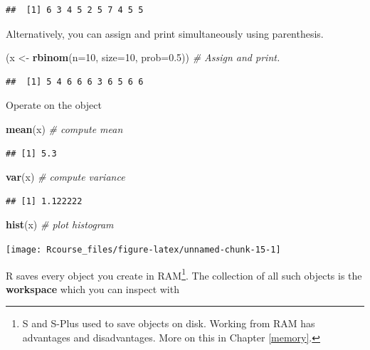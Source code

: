 \documentclass[]{book}
\newenvironment{Shaded}{\begin{snugshade}}{\end{snugshade}}
\newcommand{\KeywordTok}[1]{\textcolor[rgb]{0.13,0.29,0.53}{\textbf{#1}}}
\newcommand{\DataTypeTok}[1]{\textcolor[rgb]{0.13,0.29,0.53}{#1}}
\newcommand{\DecValTok}[1]{\textcolor[rgb]{0.00,0.00,0.81}{#1}}
\newcommand{\FloatTok}[1]{\textcolor[rgb]{0.00,0.00,0.81}{#1}}
\newcommand{\StringTok}[1]{\textcolor[rgb]{0.31,0.60,0.02}{#1}}
\newcommand{\CommentTok}[1]{\textcolor[rgb]{0.56,0.35,0.01}{\textit{#1}}}
\newcommand{\NormalTok}[1]{#1}
\theoremstyle{definition}
\theoremstyle{definition}
\theoremstyle{definition}
\theoremstyle{remark}
\begin{document}
\begin{verbatim}
##  [1] 6 3 4 5 2 5 7 4 5 5
\end{verbatim}

Alternatively, you can assign and print simultaneously using
parenthesis.

\begin{Shaded}
\begin{Highlighting}[]
\NormalTok{(x <-}\StringTok{ }\KeywordTok{rbinom}\NormalTok{(}\DataTypeTok{n=}\DecValTok{10}\NormalTok{, }\DataTypeTok{size=}\DecValTok{10}\NormalTok{, }\DataTypeTok{prob=}\FloatTok{0.5}\NormalTok{))  }\CommentTok{# Assign and print.}
\end{Highlighting}
\end{Shaded}

\begin{verbatim}
##  [1] 5 4 6 6 6 3 6 5 6 6
\end{verbatim}

Operate on the object

\begin{Shaded}
\begin{Highlighting}[]
\KeywordTok{mean}\NormalTok{(x)  }\CommentTok{# compute mean}
\end{Highlighting}
\end{Shaded}

\begin{verbatim}
## [1] 5.3
\end{verbatim}

\begin{Shaded}
\begin{Highlighting}[]
\KeywordTok{var}\NormalTok{(x)  }\CommentTok{# compute variance}
\end{Highlighting}
\end{Shaded}

\begin{verbatim}
## [1] 1.122222
\end{verbatim}

\begin{Shaded}
\begin{Highlighting}[]
\KeywordTok{hist}\NormalTok{(x) }\CommentTok{# plot histogram}
\end{Highlighting}
\end{Shaded}

\texttt{[image: Rcourse\_files/figure-latex/unnamed-chunk-15-1]}

R saves every object you create in RAM\footnote{S and S-Plus used to
  save objects on disk. Working from RAM has advantages and
  disadvantages. More on this in Chapter \ref{memory}.}. The collection
of all such objects is the \textbf{workspace} which you can inspect with
\end{document}
